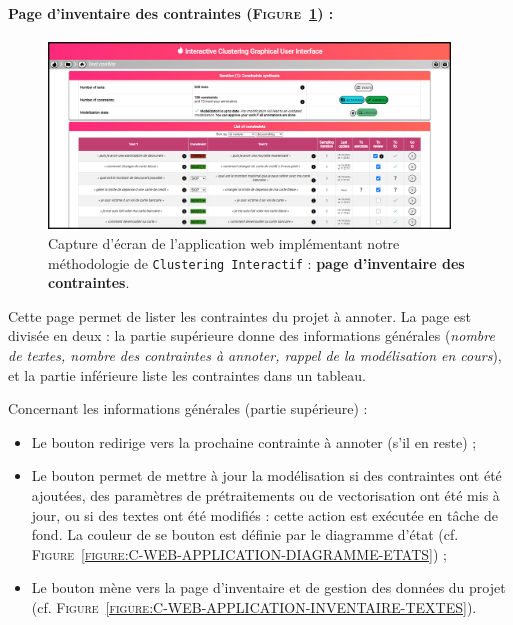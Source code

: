 		
		\paragraph{Page d'inventaire des contraintes (\textsc{Figure~\ref{figure:C-WEB-APPLICATION-INVENTAIRE-CONTRAINTES}}) :}
		
			\begin{figure}[H]
				\centering
				\includegraphics[width=0.95\textwidth]{figures/interactive-clustering-application-contraintes}
				\caption{
					Capture d'écran de l'application web implémentant notre méthodologie de \texttt{Clustering Interactif} : \textbf{page d'inventaire des contraintes}.
				}
				\label{figure:C-WEB-APPLICATION-INVENTAIRE-CONTRAINTES}
			\end{figure}
			
			Cette page permet de lister les contraintes du projet à annoter.
			La page est divisée en deux : la partie supérieure donne des informations générales (\textit{nombre de textes, nombre des contraintes à annoter, rappel de la modélisation en cours}), et la partie inférieure liste les contraintes dans un tableau.
			
			Concernant les informations générales (partie supérieure) :
			\begin{itemize}
				\item Le bouton  redirige vers la prochaine contrainte à annoter (s'il en reste) ;
				\item Le bouton  permet de mettre à jour la modélisation si des contraintes ont été ajoutées, des paramètres de prétraitements ou de vectorisation ont été mis à jour, ou si des textes ont été modifiés : cette action est exécutée en tâche de fond.
				La couleur de se bouton est définie par le diagramme d'état (cf. \textsc{Figure~\ref{figure:C-WEB-APPLICATION-DIAGRAMME-ETATS}}) ;
				\item Le bouton  mène vers la page d'inventaire et de gestion des données du projet (cf. \textsc{Figure~\ref{figure:C-WEB-APPLICATION-INVENTAIRE-TEXTES}}).
			\end{itemize}
			
